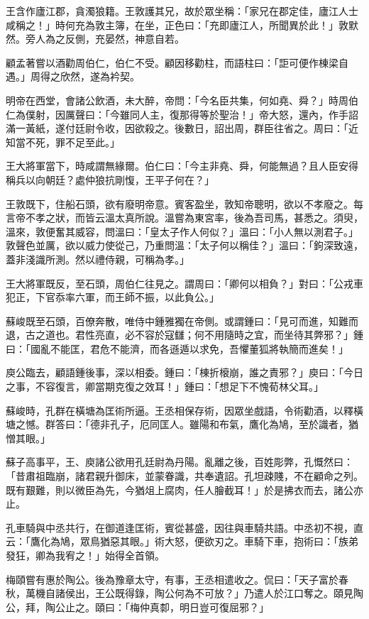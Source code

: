 王含作廬江郡，貪濁狼籍。王敦護其兄，故於眾坐稱：「家兄在郡定佳，廬江人士咸稱之！」時何充為敦主簿，在坐，正色曰：「充即廬江人，所聞異於此！」敦默然。旁人為之反側，充晏然，神意自若。

顧孟著嘗以酒勸周伯仁，伯仁不受。顧因移勸柱，而語柱曰：「詎可便作棟梁自遇。」周得之欣然，遂為衿契。

明帝在西堂，會諸公飲酒，未大醉，帝問：「今名臣共集，何如堯、舜？」時周伯仁為僕射，因厲聲曰：「今雖同人主，復那得等於聖治！」帝大怒，還內，作手詔滿一黃紙，遂付廷尉令收，因欲殺之。後數日，詔出周，群臣往省之。周曰：「近知當不死，罪不足至此。」

王大將軍當下，時咸謂無緣爾。伯仁曰：「今主非堯、舜，何能無過？且人臣安得稱兵以向朝廷？處仲狼抗剛愎，王平子何在？」

王敦既下，住船石頭，欲有廢明帝意。賓客盈坐，敦知帝聰明，欲以不孝廢之。每言帝不孝之狀，而皆云溫太真所說。溫嘗為東宮率，後為吾司馬，甚悉之。須臾，溫來，敦便奮其威容，問溫曰：「皇太子作人何似？」溫曰：「小人無以測君子。」敦聲色並厲，欲以威力使從己，乃重問溫：「太子何以稱佳？」溫曰：「鉤深致遠，蓋非淺識所測。然以禮侍親，可稱為孝。」

王大將軍既反，至石頭，周伯仁往見之。謂周曰：「卿何以相負？」對曰：「公戎車犯正，下官忝率六軍，而王師不振，以此負公。」

蘇峻既至石頭，百僚奔散，唯侍中鍾雅獨在帝側。或謂鍾曰：「見可而進，知難而退，古之道也。君性亮直，必不容於寇讎；何不用隨時之宜，而坐待其弊邪？」鍾曰：「國亂不能匡，君危不能濟，而各遜遁以求免，吾懼董狐將執簡而進矣！」

庾公臨去，顧語鍾後事，深以相委。鍾曰：「棟折榱崩，誰之責邪？」庾曰：「今日之事，不容復言，卿當期克復之效耳！」鍾曰：「想足下不愧荀林父耳。」

蘇峻時，孔群在橫塘為匡術所逼。王丞相保存術，因眾坐戲語，令術勸酒，以釋橫塘之憾。群答曰：「德非孔子，厄同匡人。雖陽和布氣，鷹化為鳩，至於識者，猶憎其眼。」

蘇子高事平，王、庾諸公欲用孔廷尉為丹陽。亂離之後，百姓彫弊，孔慨然曰：「昔肅祖臨崩，諸君親升御床，並蒙眷識，共奉遺詔。孔坦疎賤，不在顧命之列。既有艱難，則以微臣為先，今猶俎上腐肉，任人膾截耳！」於是拂衣而去，諸公亦止。

孔車騎與中丞共行，在御道逢匡術，賓從甚盛，因往與車騎共語。中丞初不視，直云：「鷹化為鳩，眾鳥猶惡其眼。」術大怒，便欲刃之。車騎下車，抱術曰：「族弟發狂，卿為我宥之！」始得全首領。

梅頤嘗有惠於陶公。後為豫章太守，有事，王丞相遣收之。侃曰：「天子富於春秋，萬機自諸侯出，王公既得錄，陶公何為不可放？」乃遣人於江口奪之。頤見陶公，拜，陶公止之。頤曰：「梅仲真厀，明日豈可復屈邪？」

